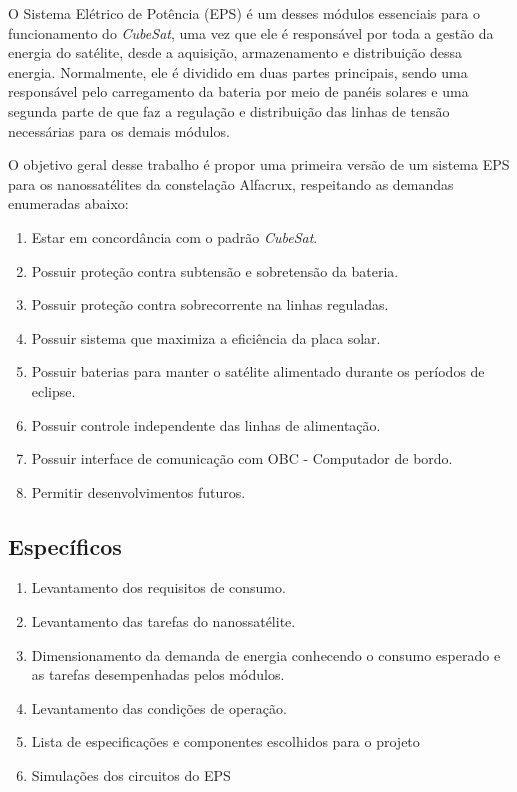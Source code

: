 O Sistema Elétrico de Potência (EPS) é um desses módulos essenciais para o funcionamento do \textit{CubeSat}, uma vez que ele é responsável por toda a gestão da energia do satélite, desde a aquisição, armazenamento e distribuição dessa energia. Normalmente, ele é dividido em duas partes principais, sendo uma responsável pelo carregamento da bateria por meio de panéis solares e uma segunda parte de que faz a regulação e distribuição das linhas de tensão necessárias para os demais módulos. 

O objetivo geral desse trabalho é propor uma primeira versão de um sistema EPS para os nanossatélites da constelação Alfacrux, respeitando as demandas enumeradas abaixo:

\begin{enumerate}
    \item Estar em concordância com o padrão \textit{CubeSat}.
    \item Possuir proteção contra subtensão e sobretensão da bateria.
    \item Possuir proteção contra sobrecorrente na linhas reguladas.
    \item Possuir sistema que maximiza a eficiência da placa solar.
    \item Possuir baterias para manter o satélite alimentado durante os períodos de eclipse.
    \item Possuir controle independente das linhas de alimentação.
    \item Possuir interface de comunicação com OBC - Computador de bordo.
    \item Permitir desenvolvimentos futuros.
\end{enumerate}{}


\subsection*{Específicos}\label{especificos}

\begin{enumerate}
    \item Levantamento dos requisitos de consumo.
    \item Levantamento das tarefas do nanossatélite.
    \item Dimensionamento da demanda de energia conhecendo o consumo esperado e as tarefas desempenhadas pelos módulos.
    \item Levantamento das condições de operação.
    \item Lista de especificações e componentes escolhidos para o projeto
    \item Simulações dos circuitos do EPS
\end{enumerate}